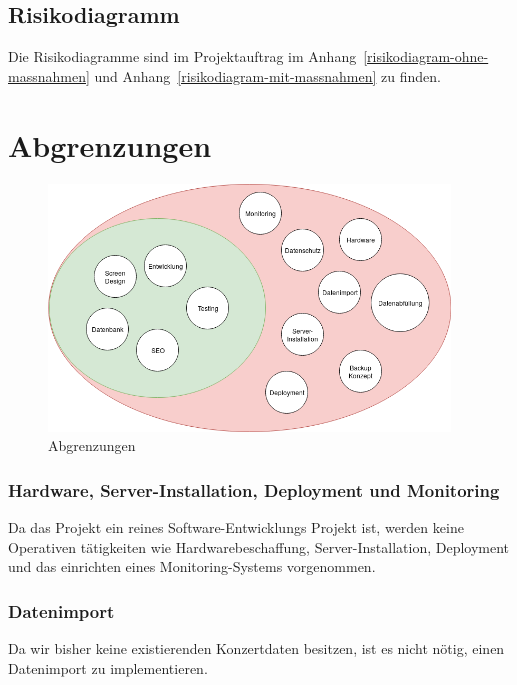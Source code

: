 \subsection{Risikodiagramm}

Die Risikodiagramme sind im Projektauftrag im Anhang~\ref{risikodiagram-ohne-massnahmen} und Anhang~\ref{risikodiagram-mit-massnahmen} zu finden.

\clearpage

\section{Abgrenzungen}

\begin{figure}[!htb]
  \centering
  \includegraphics[width=0.95\textwidth]{figures/abgrenzungen.png}
  \caption{Abgrenzungen}
\end{figure}

\subsubsection{Hardware, Server-Installation, Deployment und
  Monitoring}\label{hardware-server-installation-deployment-und-monitoring}

Da das Projekt ein reines Software-Entwicklungs Projekt ist, werden
keine Operativen tätigkeiten wie Hardwarebeschaffung,
Server-Installation, Deployment und das einrichten eines
Monitoring-Systems vorgenommen.

\subsubsection{Datenimport}\label{datenimport}

Da wir bisher keine existierenden Konzertdaten besitzen, ist es nicht
nötig, einen Datenimport zu implementieren.


